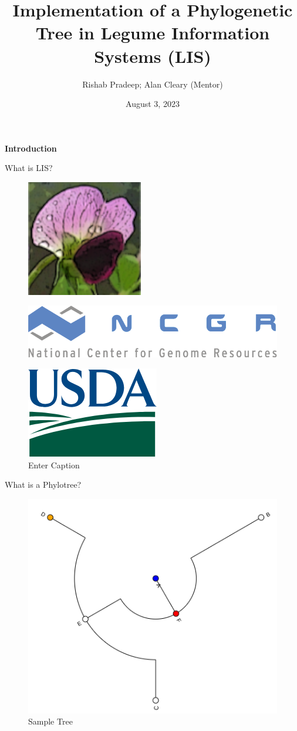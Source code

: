 \documentclass[aspectratio=169]{beamer}
\title{Implementation of a Phylogenetic Tree in Legume Information Systems (LIS)}
\author{Rishab Pradeep; Alan Cleary (Mentor)}
\institute[ICR]{Institute for Computing in Research}
\date{August 3, 2023}
\begin{document}
\begin{frame}[plain]
    \maketitle
\end{frame}
\begin{frame}
	\large{\textbf{Introduction}}
\end{frame}
\begin{frame}{What is LIS?}

	\begin{figure}
		\centering
		\includegraphics[width=0.2\linewidth]{imgs/lis-logo.png}
	\end{figure}
 \begin{figure}
     \centering
     \includegraphics[width=0.2\linewidth]{imgs/ncgr-logo.png}
    
 \end{figure}
 \begin{figure}
     \centering
     \includegraphics[height=0.3\linewidth]{imgs/usda-logo.png}
     \caption{Enter Caption}
 \end{figure}
	
\end{frame}
\begin{frame}{What is a Phylotree?}
	\begin{figure}
		\centering
		\includegraphics[width=0.55\linewidth]{imgs/phylotee}
		\caption{Sample Tree}
	\end{figure}
\end{frame}
\end{document}
